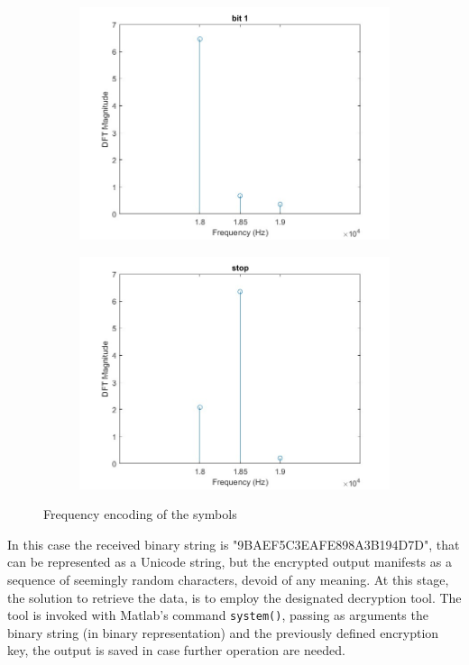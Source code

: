 \begin{figure}[H]
\begin{subfigure}{0.48\textwidth}
    \includegraphics[width=\textwidth]{LiveAudioWatermarking/images/bit1.jpg}
    \caption{}
    \label{}
    \end{subfigure}%
    \hfill
     \begin{subfigure}{0.48\textwidth}
    \includegraphics[width=\textwidth]{LiveAudioWatermarking/images/stop_bit.jpg}
    \caption{}
    \label{}
    \end{subfigure}
    \caption{Frequency encoding of the symbols}
    \label{fig:symbols}
\end{figure}
In this case the received binary string is "9BAEF5C3EAFE898A3B194D7D", that can be represented as a Unicode string, but the encrypted output manifests as a sequence of seemingly random characters, devoid of any meaning.
At this stage, the solution to retrieve the data, is to employ the designated decryption tool. The tool is invoked with Matlab's command \texttt{system()}, passing as arguments the binary string (in binary representation) and the previously defined encryption key, the output is saved in case further operation are needed.

